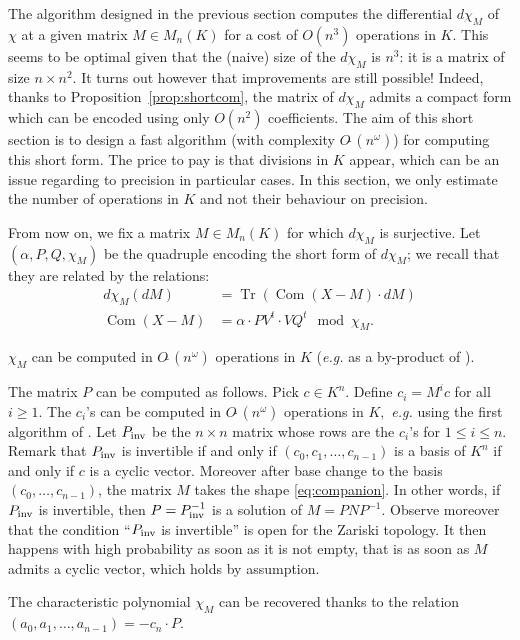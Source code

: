 \documentclass{sig-alternate-05-2015}
\DeclareMathOperator{\tr}{Tr}
\DeclareMathOperator{\com}{Com}
\newcommand{\softO}{O\tilde{~}}
\newcommand{\inv}{\text{\rm inv}}
\begin{document}
The algorithm designed in the previous section computes the differential 
$d \chi_M$ of $\chi$ at a given matrix $M \in M_n(K)$ for a cost of 
$O(n^3)$ operations in $K$. This seems to be optimal given that the 
(naive) size of the $d \chi_M$ is $n^3$: it is a matrix of size $n
\times n^2$. It turns out however that improvements are still possible!
Indeed, thanks to Proposition~\ref{prop:shortcom}, the matrix of 
$d \chi_M$ admits a compact form which can be encoded using only $O(n^2)$ 
coefficients. The aim of this short section is to design a fast 
algorithm (with complexity $\softO(n^\omega)$) for computing this short 
form. The price to pay is that divisions in $K$ appear, which can be an 
issue regarding to precision in particular cases.
In this section, we only estimate the number of operations in $K$
and not their behaviour on precision.

From now on, we fix a matrix $M \in M_n(K)$ for which $d \chi_M$ is 
surjective. Let $(\alpha, P, Q, \chi_M)$ be the quadruple encoding
the short form of $d \chi_M$; we recall that they are related by the
relations:
\begin{align*}
d \chi_M(dM) & =\tr(\com(X{-}M) \cdot dM) \\
\com(X{-}M) & = \alpha \cdot P V^t \cdot V Q^t \mod \chi_M.
\end{align*}

$\chi_M$ can be computed in $\softO(n^\omega)$ operations in $K$
(\textit{e.g.} as a by-product of \cite{storjohann:01a}).

The matrix $P$ can be computed as follows. Pick $c \in K^n$. Define 
$c_i = M^i c$ for all $i \geq 1$. The $c_i$'s can be computed in 
$\softO(n^\omega)$ operations in $K,$ \textit{e.g.}
using the first algorithm
of \cite{keller-gehrig:85a}. Let $P_\inv$ be the 
$n \times n$ matrix whose rows are the $c_i$'s for $1 \leq i \leq n$. 
Remark that $P_\inv$ is invertible if and only if $(c_0, c_1, \ldots, 
c_{n-1})$ is a basis of $K^n$ if and only if $c$ is a cyclic vector. 
Moreover after base change to the basis $(c_0, \ldots, c_{n-1})$, the matrix 
$M$ takes the shape \eqref{eq:companion}. In other words, if $P_\inv$
is invertible, then $P = P_\inv^{-1}$ is a solution of $M = P N P^{-1}$.
Observe moreover that the condition ``$P_\inv$ is invertible'' is open
for the Zariski topology. It then happens with high probability as soon
as it is not empty, that is as soon as $M$ admits a cyclic vector, which
holds by assumption.


The characteristic polynomial $\chi_M$ can be recovered thanks to the
relation $(a_0, a_1, \ldots, a_{n-1}) = -c_n \cdot P$.
\end{document}
